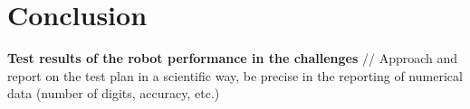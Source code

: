 \chapter{Conclusion}

\textbf{Test results of the robot performance in the challenges} //
Approach and report on the test plan in a scientific way, be precise in the reporting of numerical data
(number of digits, accuracy, etc.)